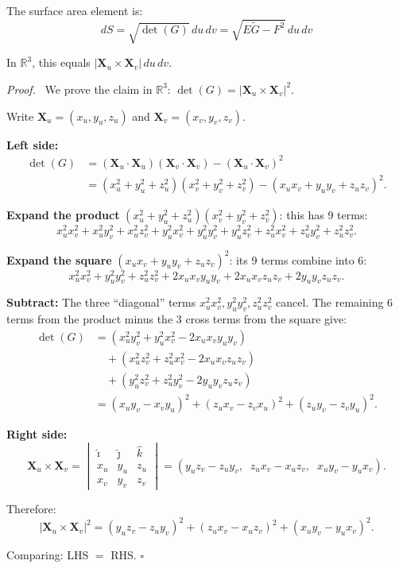 \documentclass[11pt]{report}
\renewenvironment{proof}[1][Proof]{\par\noindent\textit{#1.}\ }{\hfill$\square$\par\medskip}
\newcommand{\R}{\mathbb{R}}
\begin{document}
\begin{theorem}
\label{thm:gram-area}
The surface area element is:
\[
\boxed{dS = \sqrt{\det(G)} \, du \, dv = \sqrt{E\tilde{G} - F^2} \, du \, dv}
\]

In $\R^3$, this equals $|\mathbf{X}_u \times \mathbf{X}_v| \, du \, dv$.
\end{theorem}

\begin{proof}
We prove the claim in $\R^3$: $\det(G) = |\mathbf{X}_u \times \mathbf{X}_v|^2$.

Write $\mathbf{X}_u = (x_u, y_u, z_u)$ and $\mathbf{X}_v = (x_v, y_v, z_v)$.

\textbf{Left side:}
\begin{align*}
\det(G) &= (\mathbf{X}_u \cdot \mathbf{X}_u)(\mathbf{X}_v \cdot \mathbf{X}_v) - (\mathbf{X}_u \cdot \mathbf{X}_v)^2 \\
&= (x_u^2 + y_u^2 + z_u^2)(x_v^2 + y_v^2 + z_v^2) - (x_u x_v + y_u y_v + z_u z_v)^2.
\end{align*}

\textbf{Expand the product} $(x_u^2 + y_u^2 + z_u^2)(x_v^2 + y_v^2 + z_v^2)$: this has 9 terms:
\[
x_u^2 x_v^2 + x_u^2 y_v^2 + x_u^2 z_v^2 + y_u^2 x_v^2 + y_u^2 y_v^2 + y_u^2 z_v^2 + z_u^2 x_v^2 + z_u^2 y_v^2 + z_u^2 z_v^2.
\]

\textbf{Expand the square} $(x_u x_v + y_u y_v + z_u z_v)^2$: its 9 terms combine into 6:
\[
x_u^2 x_v^2 + y_u^2 y_v^2 + z_u^2 z_v^2 + 2x_u x_v y_u y_v + 2x_u x_v z_u z_v + 2y_u y_v z_u z_v.
\]

\textbf{Subtract:} The three ``diagonal'' terms $x_u^2 x_v^2, y_u^2 y_v^2, z_u^2 z_v^2$ cancel. The remaining 6 terms from the product minus the 3 cross terms from the square give:
\begin{align*}
\det(G) &= (x_u^2 y_v^2 + y_u^2 x_v^2 - 2x_u x_v y_u y_v) \\
&\quad + (x_u^2 z_v^2 + z_u^2 x_v^2 - 2x_u x_v z_u z_v) \\
&\quad + (y_u^2 z_v^2 + z_u^2 y_v^2 - 2y_u y_v z_u z_v) \\
&= (x_u y_v - x_v y_u)^2 + (z_u x_v - z_v x_u)^2 + (z_u y_v - z_v y_u)^2.
\end{align*}

\textbf{Right side:}
\[
\mathbf{X}_u \times \mathbf{X}_v = \begin{vmatrix} \hat{\imath} & \hat{\jmath} & \hat{k} \\ x_u & y_u & z_u \\ x_v & y_v & z_v \end{vmatrix} = (y_u z_v - z_u y_v, \;\; z_u x_v - x_u z_v, \;\; x_u y_v - y_u x_v).
\]

Therefore:
\[
|\mathbf{X}_u \times \mathbf{X}_v|^2 = (y_u z_v - z_u y_v)^2 + (z_u x_v - x_u z_v)^2 + (x_u y_v - y_u x_v)^2.
\]

Comparing: LHS $= $ RHS. \qedhere
\end{proof}
\end{document}
